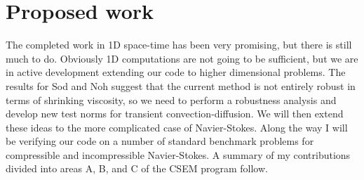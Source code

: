 \documentclass[Proposal.tex]{subfiles}
\begin{document}
\chapter{Proposed work}
\label{sec:proposed}
The completed work in 1D space-time has been very promising, but there is still much to do. 
Obviously 1D computations are not going to be sufficient, but we are in active development extending our code
to higher dimensional problems.
The results for Sod and Noh suggest that the current method is not entirely robust in terms of shrinking viscosity,
so we need to perform a robustness analysis and develop new test norms for transient convection-diffusion.
We will then extend these ideas to the more complicated case of Navier-Stokes.
Along the way I will be verifying our code on a number of standard benchmark problems for compressible and incompressible Navier-Stokes.
A summary of my contributions divided into areas A, B, and C of the CSEM program follow.
\end{document}
